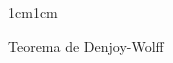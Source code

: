 \begin{adjustwidth}{1cm}{1cm}
\begin{subsection}{Teorema de Denjoy-Wolff}






\end{subsection}
\end{adjustwidth}
